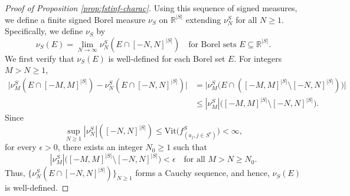 \documentclass[10pt]{article}
\newcommand{\R}{{\mathbb R}}
\newcommand{\vit}{{\text{Vit}}}
\begin{document}
\begin{proof}[Proof of Proposition \ref{prop:fstinf-charac}]
Using this sequence of signed measures, we define a finite signed Borel 
measure $\nu_S$ on $\R^{|S|}$ extending $\nu^S_{N}$ for all $N \ge 1$.
Specifically, we define $\nu_S$ by 
\begin{equation*}
    \nu_S(E) = \lim_{N \to \infty} \nu^S_{N}(E \cap [-N, N]^{|S|})
    \quad \text{for Borel sets } E \subseteq \R^{|S|}.
\end{equation*}
We first verify that $\nu_S(E)$ is well-defined for each Borel set $E$.
For integers $M > N \ge 1$, 
\begin{equation*}
\begin{aligned}
    \big|\nu^S_{M}(E \cap [-M, M]^{|S|}) 
    - \nu^S_{N}(E \cap [-N, N]^{|S|})\big| 
    &= \big|\nu^S_{M}\big(E \cap 
    ([-M, M]^{|S|} \setminus [-N, N]^{|S|})\big)\big| \\
    &\le |\nu^S_{M}|\big([-M, M]^{|S|} \setminus [-N, N]^{|S|}\big).
\end{aligned}
\end{equation*}
Since 
\begin{equation*}
    \sup_{N \ge 1} |\nu^S_{N}|([-N, N]^{|S|}) 
    \le \vit\big(f^S_{(a_j, j \in S^c)}\big) < \infty,
\end{equation*}
for every $\epsilon > 0$, there exists an integer $N_0 \ge 1$ such that
\begin{equation*}
    |\nu^S_{M}|\big([-M, M]^{|S|} \setminus [-N, N]^{|S|}\big) < \epsilon
    \quad \text{for all } M > N \ge N_0.
\end{equation*}
Thus, $\{\nu^S_{N}(E \cap [-N, N]^{|S|})\}_{N \ge 1}$ 
forms a Cauchy sequence, and hence, $\nu_S(E)$ is well-defined.


\end{proof}
\end{document}
